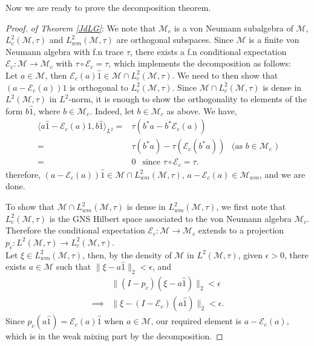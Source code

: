 \documentclass[11pt]{amsart}
\theoremstyle{definition}
\theoremstyle{myremark}
\numberwithin{equation}{section}
\newcommand{\CE}{\mathcal{E}}
\newcommand{\CM}{\mathcal{M}}
\begin{document}
\noindent Now we are ready to prove the decomposition theorem.
\begin{proof} \textit{of Theorem \ref{JdLG}}: 
We note that  $\CM_{c}$ is a von Neumann subalgebra of $\CM$,  $L^{2}_c(\CM,\tau)$ and $L_{wm}^{2}(\CM,\tau)$ are orthogonal subspaces. Since $\CM$ is a finite von Neumann algebra with f.n trace $\tau$, there exists a f.n conditional expectation  $\CE_{c}: \CM \to \CM_c$ with $ \tau \circ \CE_c = \tau$,  which implements the   decomposition as follows:\\
\noindent Let $a\in \CM$, then $\CE_{c}(a)\widehat{1}\in \CM \cap L_c^{2}(\CM,\tau)$. We need to then show that $(a-\CE_{c}(a))\widehat{1}$ is orthogonal to $L_c^{2}(\CM,\tau)$. Since $\CM \cap L_c^{2}(\CM,\tau)$ is dense in $L^{2}(\CM,\tau)$ in $L^{2}$-norm, it is enough to show the orthogonality to elements of the form $b\widehat{1}$, where $b \in \CM_{c}$.
Indeed, let $b \in \CM_{c}$ as above. We have,
\begin{align*}
 \langle a\widehat{1}-\CE_{c}(a)\widehat{1},b\widehat{1}\rangle_{L^{2}}
=&\tau(b^{*}a-b^{*}\CE_{c}(a))\\
=&\tau(b^{*}a)-\tau(\CE_{c}(b^{*}a)) ~~\text{ (as $b \in \CM_{c}$ )}\\
=&0~ ~\text{ since } \tau \circ \CE_c = \tau.
\end{align*}
therefore, $(a-\CE_{c}(a))\widehat{1} \in \CM \cap L_{wm}^{2}(\CM,\tau)$, $a-\CE_{c}(a) \in \CM_{wm}$, and we are done.

\medskip
\noindent
To show that $\CM \cap L_{wm}^{2}(\CM,\tau)$ is dense in $L^{2}_{wm}(\CM,\tau)$,  we first note that  $L_{c}^{2}(\CM,\tau)$ is the GNS  Hilbert space associated to the von Neumann algebra $\CM_{c}$.  Therefore the conditional expectation $\CE_{c}:\CM \rightarrow \CM_{c}$ extends to a projection $p_{c}:L^{2}(\CM,\tau) \rightarrow L_{c}^{2}(\CM,\tau)$.\\
Let $\xi \in L_{wm}^{2}(\CM,\tau)$, then, by the density of $\CM$ in $L^{2}(\CM,\tau)$, given $\epsilon >0$, there exists $a \in \CM$ such that $\|\xi-a\widehat{1}\|_{2}<\epsilon$, and
\begin{align*}
&\|(I-p_c)(\xi-a\widehat{1})\|_{2}<\epsilon \\
\implies &\|\xi-(I-\CE_c)(a\widehat{1})\|_{2}<\epsilon.
\end{align*}
Since $p_{c}(a\widehat{1})=\CE_{c}(a)\widehat{1}$ when $a\in\CM$, our required element is $a-\CE_{c}(a)$, which is in the weak mixing part by the decomposition.
\end{proof}
\end{document}
